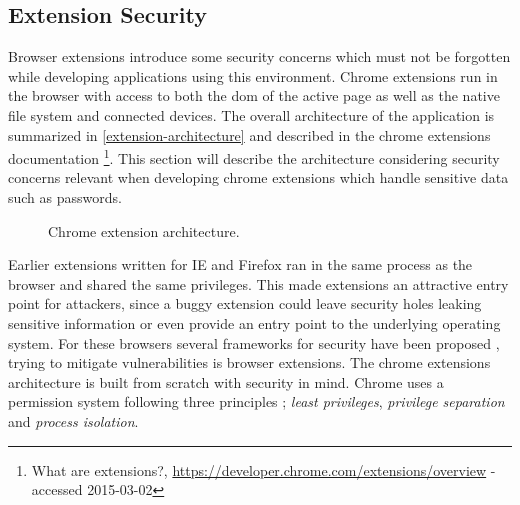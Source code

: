 \subsection{Extension Security}\label{extension-sec}
\par Browser extensions introduce some security concerns which must not be forgotten while developing applications using this environment. Chrome extensions run in the browser with access to both the \gls{dom} of the active page as well as the native file system and connected devices. The overall architecture of the application is summarized in \autoref{extension-architecture} and described in the chrome extensions documentation \footnote{What are extensions?, \url{https://developer.chrome.com/extensions/overview} - accessed 2015-03-02}. This section will describe the architecture considering security concerns relevant when developing chrome extensions which handle sensitive data such as passwords.



\begin{figure}[h]
    \caption{Chrome extension architecture.}
    \label{extension-architecture}
\end{figure}

\par Earlier extensions written for IE and Firefox ran in the same process as the browser and shared the same privileges. This made extensions an attractive entry point for attackers, since a buggy extension could leave security holes leaking sensitive information or even provide an entry point to the underlying operating system. For these browsers several frameworks for security have been proposed \cite{firefox-ie, js-info-flow}, trying to mitigate vulnerabilities is browser extensions. The chrome extensions architecture is built from scratch with security in mind. Chrome uses a permission system following three principles \cite{liu-chrome}; \emph{least privileges}, \emph{privilege separation} and \emph{process isolation}. 


